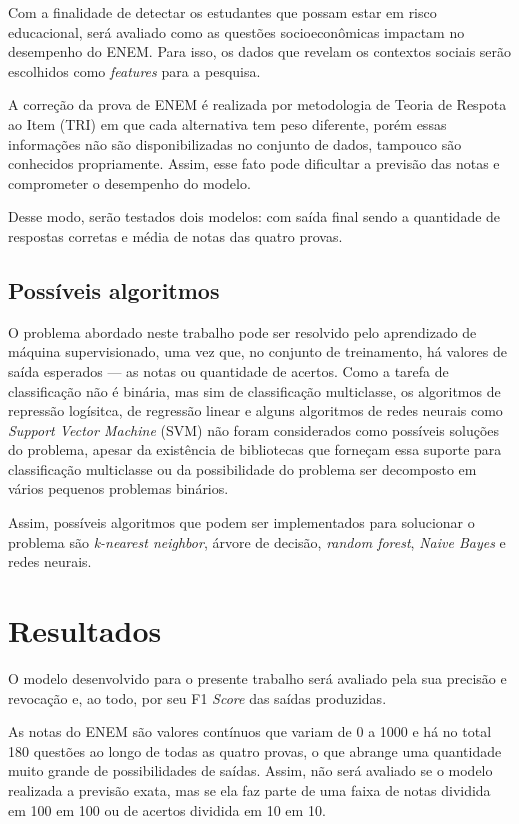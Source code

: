 \documentclass[letterpaper]{article} %
\begin{document}
Com a finalidade de detectar os estudantes que possam estar em risco educacional, será avaliado como as questões socioeconômicas impactam no desempenho do ENEM. Para isso, os dados que revelam os contextos sociais serão escolhidos como \emph{features} para a pesquisa.

A correção da prova de ENEM é realizada por metodologia de Teoria de Respota ao Item (TRI) em que cada alternativa tem peso diferente, porém essas informações não são disponibilizadas no conjunto de dados, tampouco são conhecidos propriamente. Assim, esse fato pode dificultar a previsão das notas e comprometer o desempenho do modelo. 

Desse modo, serão testados dois modelos: com saída final sendo a quantidade de respostas corretas e média de notas das quatro provas. 


\subsection{Possíveis algoritmos}

O problema abordado neste trabalho pode ser resolvido pelo aprendizado de máquina supervisionado, uma vez que, no conjunto de treinamento, há valores de saída esperados — as notas ou quantidade de acertos. Como a tarefa de classificação não é binária, mas sim de classificação multiclasse, os algoritmos de repressão logísitca, de regressão linear e alguns algoritmos de redes neurais como \emph{Support Vector Machine} (SVM) não foram considerados como possíveis soluções do problema, apesar da existência de bibliotecas que forneçam essa suporte para classificação multiclasse ou da possibilidade do problema ser decomposto em vários pequenos problemas binários. 

Assim, possíveis algoritmos que podem ser implementados para solucionar o problema são \emph{k-nearest neighbor}, árvore de decisão, \emph{random forest}, \emph{Naive Bayes} e redes neurais.



\section{Resultados}

O modelo desenvolvido para o presente trabalho será avaliado pela sua precisão e revocação e, ao todo, por seu F1 \emph{Score} das saídas produzidas.

As notas do ENEM são valores contínuos que variam de 0 a 1000 e há no total 180 questões ao longo de todas as quatro provas, o que abrange uma quantidade muito grande de possibilidades de saídas. Assim, não será avaliado se o modelo realizada a previsão exata, mas se ela faz parte de uma faixa de notas dividida em 100 em 100 ou de acertos dividida em 10 em 10.
\end{document}
